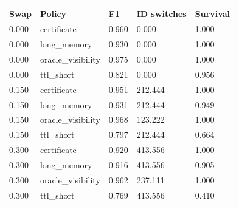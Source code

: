 \begin{tabular}{lllll}
\toprule
Swap & Policy & F1 & ID switches & Survival \\
\midrule
0.000 & certificate & 0.960 & 0.000 & 1.000 \\
0.000 & long\_memory & 0.930 & 0.000 & 1.000 \\
0.000 & oracle\_visibility & 0.975 & 0.000 & 1.000 \\
0.000 & ttl\_short & 0.821 & 0.000 & 0.956 \\
0.150 & certificate & 0.951 & 212.444 & 1.000 \\
0.150 & long\_memory & 0.931 & 212.444 & 0.949 \\
0.150 & oracle\_visibility & 0.968 & 123.222 & 1.000 \\
0.150 & ttl\_short & 0.797 & 212.444 & 0.664 \\
0.300 & certificate & 0.920 & 413.556 & 1.000 \\
0.300 & long\_memory & 0.916 & 413.556 & 0.905 \\
0.300 & oracle\_visibility & 0.962 & 237.111 & 1.000 \\
0.300 & ttl\_short & 0.769 & 413.556 & 0.410 \\
\bottomrule
\end{tabular}
